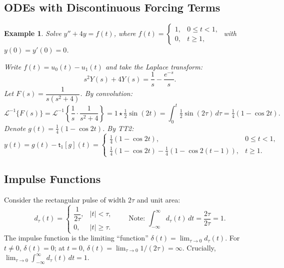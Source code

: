 \documentclass{article}
\newtheorem*{example}{Example}
\newcommand{\Linv}{\mathcal{L}^{-1}}
\newcommand{\conv}{\star}
\begin{document}
\subsection{ODEs with Discontinuous Forcing Terms}

\begin{example}
    Solve $y'' + 4y = f(t)$, where $f(t) = \begin{cases}1, & 0\leq t<1,\\ 0, & t\geq 1,\end{cases}$ with $y(0) = y'(0) = 0$.

    Write $f(t) = u_0(t) - u_1(t)$ and take the Laplace transform:
    \[s^2Y(s) + 4Y(s) = \frac{1}{s} - \frac{e^{-s}}{s}.\]
    Let $F(s) = \dfrac{1}{s(s^2+4)}$. By convolution:
    \[\Linv\{F(s)\} = \Linv\!\left\{\frac{1}{s}\cdot\frac{1}{s^2+4}\right\} = 1\conv\tfrac{1}{2}\sin(2t) = \int_0^t \tfrac{1}{2}\sin(2\tau)\,d\tau = \tfrac{1}{4}(1-\cos 2t).\]
    Denote $g(t) = \tfrac{1}{4}(1-\cos 2t)$. By TT2:
    \[y(t) = g(t) - \mathsf{t}_1[g](t) = \begin{cases}\frac{1}{4}(1-\cos 2t), & 0\leq t<1,\\[4pt] \frac{1}{4}(1-\cos 2t) - \frac{1}{4}(1-\cos 2(t-1)), & t\geq 1.\end{cases}\]
\end{example}

\subsection{Impulse Functions}

Consider the rectangular pulse of width $2\tau$ and unit area:
\[d_\tau(t) = \begin{cases}\dfrac{1}{2\tau}, & |t| < \tau,\\[4pt] 0, & |t|\geq\tau.\end{cases} \qquad\text{Note: } \int_{-\infty}^{\infty}d_\tau(t)\,dt = \frac{2\tau}{2\tau} = 1.\]
The impulse function is the limiting ``function'' $\delta(t) = \lim_{\tau\to 0} d_\tau(t)$. For $t\neq 0$, $\delta(t) = 0$; at $t = 0$, $\delta(t) = \lim_{\tau\to 0} 1/(2\tau) = \infty$. Crucially, $\lim_{\tau\to 0}\int_{-\infty}^{\infty} d_\tau(t)\,dt = 1$.
\end{document}
